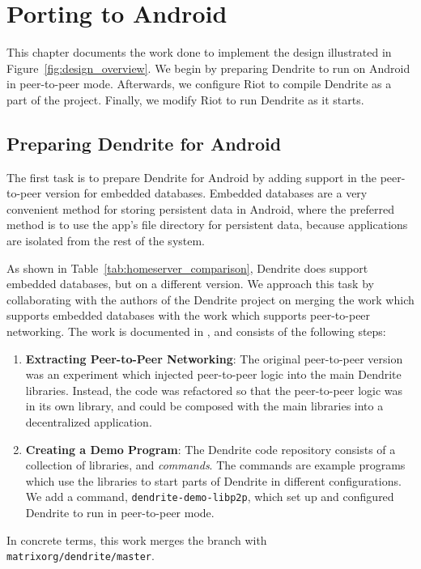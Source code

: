 \chapter{Porting to Android}\label{chp:implementation}
This chapter documents the work done to implement the design illustrated in Figure~\ref{fig:design_overview}.
We begin by preparing Dendrite to run on Android in peer-to-peer mode.
Afterwards, we configure Riot to compile Dendrite as a part of the project.
Finally, we modify Riot to run Dendrite as it starts.

\section{Preparing Dendrite for Android}
The first task is to prepare Dendrite for Android by adding support in the peer-to-peer version for embedded databases.
Embedded databases are a very convenient method for storing persistent data in Android, where the preferred method is to use the app's file directory for persistent data\footnotemark, because applications are isolated from the rest of the system.
%

As shown in Table~\ref{tab:homeserver_comparison}, Dendrite does support embedded databases, but on a different version.
We approach this task by collaborating with the authors of the Dendrite project on merging the work which supports embedded databases with the work which supports peer-to-peer networking.
The work is documented in , and consists of the following steps:
\begin{enumerate}
	\item{
	      \textbf{Extracting Peer-to-Peer Networking}:
	      The original peer-to-peer version was an experiment which injected peer-to-peer logic into the main Dendrite libraries.
	      Instead, the code was refactored so that the peer-to-peer logic was in its own library, and could be composed with the main libraries into a decentralized application.
	      }
	\item{
	      \textbf{Creating a Demo Program}:
	      The Dendrite code repository consists of a collection of libraries, and \textit{commands}.
	      The commands are example programs which use the libraries to start parts of Dendrite in different configurations.
	      We add a command, \texttt{dendrite-demo-libp2p}, which set up and configured Dendrite to run in peer-to-peer mode.
	      }
\end{enumerate}
In concrete terms, this work merges the  branch with \texttt{matrix\-org/dendrite/master}.

